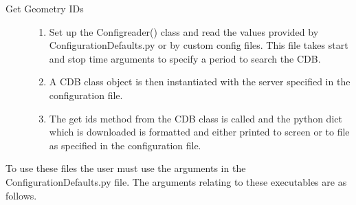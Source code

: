 \begin{description}
  \item[Get Geometry IDs]
  \begin{enumerate}
   \item Set up the Configreader() class and read the values provided by ConfigurationDefaults.py or by custom config files. This file takes start
and stop time arguments to specify a period to search the CDB.
   \item A CDB class object is then instantiated with the server specified in the configuration file.
   \item The get ids method from the CDB class is called and the python dict which is downloaded is formatted and either printed to screen or to file
as specified in the configuration file.
  \end{enumerate}
\end{description}

To use these files the user must use the arguments in the ConfigurationDefaults.py file. The arguments relating to these executables are as follows.

